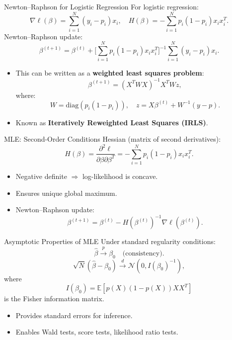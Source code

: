 \documentclass[../../main.tex]{subfiles}
\begin{document}
\begin{frame}{Newton--Raphson for Logistic Regression}
For logistic regression:
\[
\nabla \ell(\beta) = \sum_{i=1}^N (y_i - p_i) x_i, 
\quad
H(\beta) = -\sum_{i=1}^N p_i(1-p_i) x_i x_i^T.
\]
Newton--Raphson update:
\[
\beta^{(t+1)} = \beta^{(t)} + \Big[ \sum_{i=1}^N p_i(1-p_i) x_i x_i^T \Big]^{-1} 
\sum_{i=1}^N (y_i - p_i)x_i.
\]
\begin{itemize}
    \item This can be written as a \textbf{weighted least squares problem}:  
    \[
    \beta^{(t+1)} = (X^T W X)^{-1} X^T W z,
    \]
    where:
    \[
    W = \mathrm{diag}(p_i(1-p_i)), \quad 
    z = X\beta^{(t)} + W^{-1}(y - p).
    \]
    \item Known as \textbf{Iteratively Reweighted Least Squares (IRLS)}.  
\end{itemize}
\end{frame}


\begin{frame}{MLE: Second-Order Conditions}
Hessian (matrix of second derivatives):
\[
H(\beta) = \frac{\partial^2 \ell}{\partial \beta \partial \beta^T} 
= -\sum_{i=1}^N p_i(1-p_i) x_i x_i^T.
\]
\begin{itemize}
    \item Negative definite $\Rightarrow$ log-likelihood is concave.  
    \item Ensures unique global maximum.  
    \item Newton–Raphson update:
    \[
    \beta^{(t+1)} = \beta^{(t)} - H(\beta^{(t)})^{-1} \nabla \ell(\beta^{(t)}).
    \]
\end{itemize}
\end{frame}

\begin{frame}{Asymptotic Properties of MLE}
Under standard regularity conditions:
\[
\hat{\beta} \xrightarrow{p} \beta_0 \quad \text{(consistency)}.
\]
\[
\sqrt{N}(\hat{\beta} - \beta_0) \xrightarrow{d} \mathcal{N}(0, I(\beta_0)^{-1}),
\]
where
\[
I(\beta_0) = \mathbb{E}\!\left[ p(X)(1-p(X))XX^T \right]
\]
is the Fisher information matrix.
\begin{itemize}
    \item Provides standard errors for inference.  
    \item Enables Wald tests, score tests, likelihood ratio tests.  
\end{itemize}
\end{frame}
\end{document}
